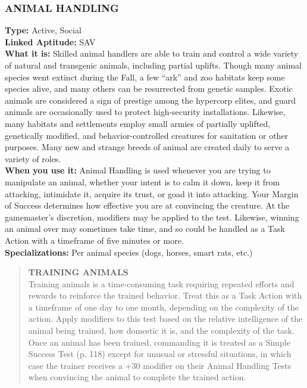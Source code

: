 \subsubsection{ANIMAL HANDLING} \textbf{Type:} Active, Social \\ \textbf{Linked Aptitude:} SAV \\ \textbf{What it is:} Skilled animal handlers are able to train and control a wide variety of natural and transgenic animals, including partial uplifts. Though many animal species went extinct during the Fall, a few “ark” and zoo habitats keep some species alive, and many others can be resurrected from genetic samples. Exotic animals are considered a sign of prestige among the hypercorp elites, and guard animals are occasionally used to protect high-security installations. Likewise, many habitats and settlements employ small armies of partially uplifted, genetically modified, and behavior-controlled creatures for sanitation or other purposes. Many new and strange breeds of animal are created daily to serve a variety of roles. \\ \textbf{When you use it:} Animal Handling is used whenever you are trying to manipulate an animal, whether your intent is to calm it down, keep it from attacking, intimidate it, acquire its trust, or goad it into attacking. Your Margin of Success determines how effective you are at convincing the creature. At the gamemaster’s discretion, modifiers may be applied to the test. Likewise, winning an animal over may sometimes take time, and so could be handled as a Task Action with a timeframe of five minutes or more. \\ \textbf{Specializations:} Per animal species (dogs, horses, smart rats, etc.) 

\begin{quotation} \textbf{TRAINING ANIMALS} \\ Training animals is a time-consuming task requiring repeated efforts and rewards to reinforce the trained behavior. Treat this as a Task Action with a timeframe of one day to one month, depending on the complexity of the action. Apply modifiers to this test based on the relative intelligence of the animal being trained, how domestic it is, and the complexity of the task. Once an animal has been trained, commanding it is treated as a Simple Success Test (p. 118) except for unusual or stressful situations, in which case the trainer receives a +30 modifier on their Animal Handling Tests when convincing the animal to complete the trained action. \end{quotation} 

